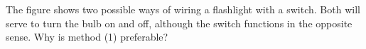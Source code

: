 The figure shows two possible ways of wiring a flashlight
        with a switch. Both will serve to turn the bulb on and off,
        although the switch functions in the opposite sense.  Why is
        method (1) preferable?
